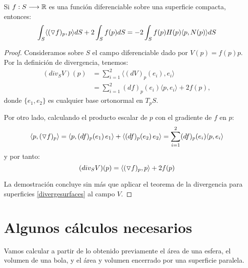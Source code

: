\begin{corolario}\label{corolariogradiente}
Si $f: S \longrightarrow \mathbb{R}$ es una función diferenciable sobre una superficie compacta, entonces:
%
\begin{equation*}
    \int_S \langle (\triangledown f)_p, p \rangle dS + 2 \int_S f(p)dS = -2 \int_S f(p)H(p) \langle p, N(p) \rangle dS
\end{equation*}
\end{corolario}
\begin{proof}
Consideramos sobre $S$ el campo diferenciable dado por $V(p)=f(p)p$. Por la definición de divergencia, tenemos:
%
\begin{align*}
    (div_S V)(p) &= \sum_{i=1}^2 \langle (dV)_p(e_i), e_i \rangle \\
    &= \sum_{i=1}^2 (df)_p(e_i) \langle p, e_i \rangle + 2f(p),
\end{align*}
%
donde $\{e_1,e_2\}$ es cualquier base ortonormal en $T_pS$.

Por otro lado, calculando el producto escalar de $p$ con el gradiente de $f$ en $p$:
%
\begin{equation*}
    \langle p, (\triangledown f)_p \rangle = \langle p, (df)_p(e_1) \, e_1 \rangle + \langle (df)_p(e_2) \, e_2 \rangle = \sum_{i=1}^2 (df)_p(e_i) \langle p, e_i \rangle 
\end{equation*}
%
y por tanto:
%
\begin{equation*}
    (div_S V)(p) = \langle (\triangledown f)_p, p \rangle + 2f(p)
\end{equation*}

La demostración concluye sin más que aplicar el teorema de la divergencia para superficies \ref{divergesurfaces} al campo $V$.
\end{proof}

\section{Algunos cálculos necesarios}

Vamos calcular a partir de lo obtenido previamente el área de una esfera, el volumen de una bola, y el área y volumen encerrado por una superficie paralela.

